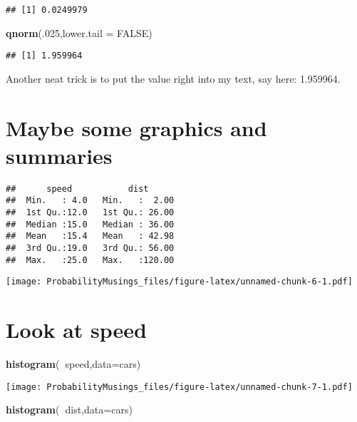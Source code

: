 \documentclass[]{article}
\newenvironment{Shaded}{\begin{snugshade}}{\end{snugshade}}
\newcommand{\KeywordTok}[1]{\textcolor[rgb]{0.13,0.29,0.53}{\textbf{#1}}}
\newcommand{\DataTypeTok}[1]{\textcolor[rgb]{0.13,0.29,0.53}{#1}}
\newcommand{\DecValTok}[1]{\textcolor[rgb]{0.00,0.00,0.81}{#1}}
\newcommand{\OtherTok}[1]{\textcolor[rgb]{0.56,0.35,0.01}{#1}}
\newcommand{\OperatorTok}[1]{\textcolor[rgb]{0.81,0.36,0.00}{\textbf{#1}}}
\newcommand{\NormalTok}[1]{#1}
\begin{document}
\begin{verbatim}
## [1] 0.0249979
\end{verbatim}

\begin{Shaded}
\begin{Highlighting}[]
\KeywordTok{qnorm}\NormalTok{(.}\DecValTok{025}\NormalTok{,}\DataTypeTok{lower.tail =} \OtherTok{FALSE}\NormalTok{)}
\end{Highlighting}
\end{Shaded}

\begin{verbatim}
## [1] 1.959964
\end{verbatim}

Another neat trick is to put the value right into my text, say here:
1.959964.

\section{Maybe some graphics and
summaries}\label{maybe-some-graphics-and-summaries}

\begin{verbatim}
##      speed           dist       
##  Min.   : 4.0   Min.   :  2.00  
##  1st Qu.:12.0   1st Qu.: 26.00  
##  Median :15.0   Median : 36.00  
##  Mean   :15.4   Mean   : 42.98  
##  3rd Qu.:19.0   3rd Qu.: 56.00  
##  Max.   :25.0   Max.   :120.00
\end{verbatim}

\texttt{[image: ProbabilityMusings\_files/figure-latex/unnamed-chunk-6-1.pdf]}

\section{Look at speed}\label{look-at-speed}

\begin{Shaded}
\begin{Highlighting}[]
\KeywordTok{histogram}\NormalTok{(}\OperatorTok{~}\NormalTok{speed,}\DataTypeTok{data=}\NormalTok{cars)}
\end{Highlighting}
\end{Shaded}

\texttt{[image: ProbabilityMusings\_files/figure-latex/unnamed-chunk-7-1.pdf]}

\begin{Shaded}
\begin{Highlighting}[]
\KeywordTok{histogram}\NormalTok{(}\OperatorTok{~}\NormalTok{dist,}\DataTypeTok{data=}\NormalTok{cars)}
\end{Highlighting}
\end{Shaded}
\end{document}

